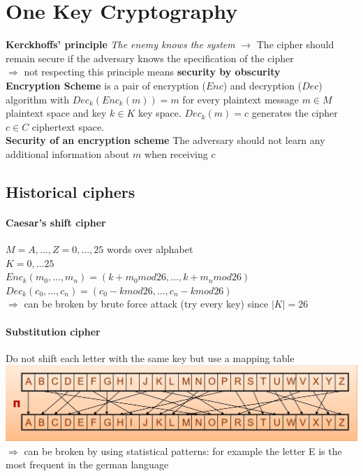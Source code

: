 \documentclass[12pt]{article}
\begin{document}
	\section{One Key Cryptography}
	\textbf{Kerckhoffs' principle} \textit{The enemy knows the system} $\rightarrow$ The cipher should remain secure if the adversary knows the specification of the cipher\\
	$\Rightarrow$ not respecting this principle means \textbf{security by obscurity}\\
	\textbf{Encryption Scheme} is a pair of encryption ($Enc$) and decryption ($Dec$) algorithm with $Dec_k(Enc_k(m)) = m$ for every plaintext message $m \in M$ plaintext space and key $k \in K$ key space. $Dec_k(m) = c$ generates the cipher $c \in C$ ciphertext space.\\
	\textbf{Security of an encryption scheme} The adversary should not learn any additional information about $m$ when receiving $c$
	
	\subsection{Historical ciphers}
	\paragraph{Caesar's shift cipher} $M = {A,...,Z} = {0,...,25}$ words over alphabet\\
	$K = {0,...25}$\\
	$Enc_k(m_0,...,m_n) = (k+m_0 mod 26,..., k+m_n mod 26)$\\
	$Dec_k(c_0,...,c_n) = (c_0-k mod 26,..., c_n-k mod 26)$\\
	$\Rightarrow$ can be broken by brute force attack (try every key) since $|K| = 26$
	\paragraph{Substitution cipher}
	Do not shift each letter with the same key but use a mapping table\\
	\includegraphics[width=\textwidth]{figures/substitution-cipher.JPG}\\
	$\Rightarrow$ can be broken by using statistical patterns: for example the letter E is the most frequent in the german language
\end{document}
